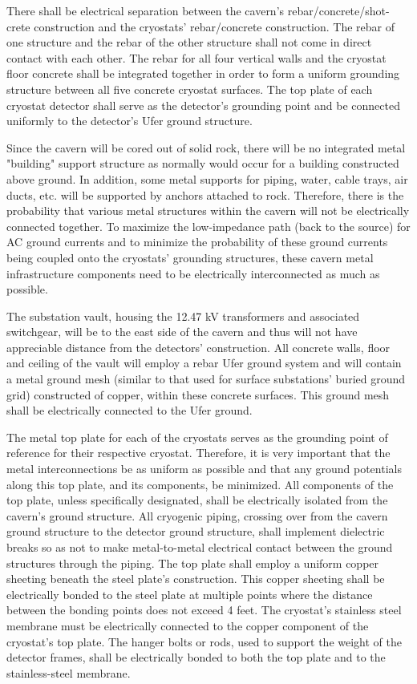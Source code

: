 There shall be electrical separation between the cavern's rebar/concrete/shot-crete construction and the cryostats' rebar/concrete construction. The rebar of one structure and the rebar of the other structure 
shall not come in direct contact with each other. The rebar for all four vertical walls and the cryostat floor concrete shall be integrated together in order to form a uniform grounding structure between all five 
concrete cryostat surfaces. The top plate of each cryostat detector shall serve as the detector's grounding point and be connected uniformly to the detector's Ufer ground structure.

Since the cavern will be cored out of solid rock, there will be no integrated metal "building" support structure as normally would occur for a building constructed above ground. In addition, some metal 
supports for piping, water, cable trays, air ducts, etc. will be supported by anchors attached to rock. Therefore, there is the probability that various metal structures within the cavern will not be electrically 
connected together. To maximize the low-impedance path (back to the source) for AC ground currents and to minimize the probability of these ground currents being coupled onto the cryostats' grounding 
structures, these cavern metal infrastructure components need to be electrically interconnected as much as possible. 

The substation vault, housing the 12.47 kV transformers and associated switchgear, will be to the east side of the cavern and thus will not have appreciable distance from the detectors' construction. All 
concrete walls, floor and ceiling of the vault will employ a rebar Ufer ground system and will contain a metal ground mesh (similar to that used for surface substations' buried ground grid) constructed of 
copper, within these concrete surfaces. This ground mesh shall be electrically connected to the Ufer ground.

The metal top plate for each of the cryostats serves as the grounding point of reference for their respective cryostat. Therefore, it is very important that the metal interconnections be as uniform as 
possible and that any ground potentials along this top plate, and its components, be minimized. All components of the top plate, unless specifically designated, shall be electrically isolated from the cavern's ground structure. All cryogenic piping, crossing over from the cavern ground structure to the 
detector ground structure, shall implement dielectric breaks so as not to make metal-to-metal electrical contact between the ground structures through the piping. The top plate shall employ a uniform copper 
sheeting beneath the steel plate's construction. This copper sheeting shall be electrically bonded to the steel plate at multiple points where the distance between the bonding points does not exceed 4 feet. The cryostat's stainless steel membrane must be electrically connected to the copper component of the 
cryostat's top plate. The hanger bolts or rods, used to support the weight of the detector frames, shall be 
electrically bonded to both the top plate and to the stainless-steel membrane.

